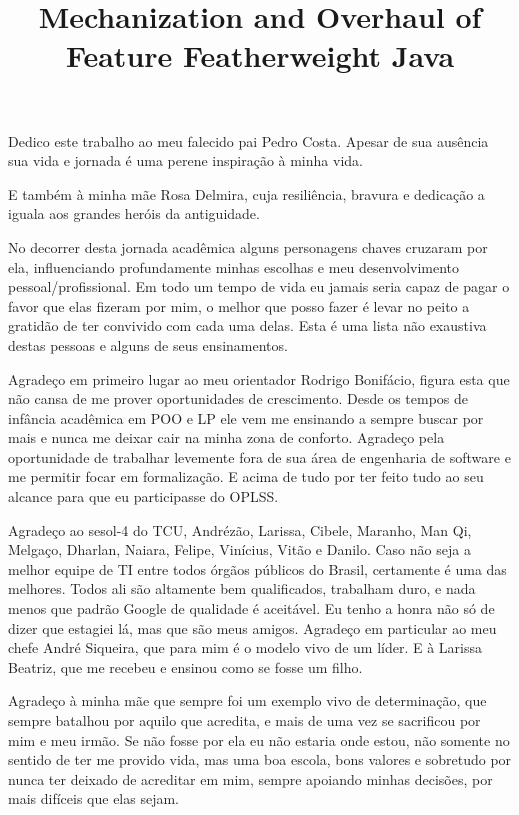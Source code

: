 \documentclass[bacharelado]{unb-cic}
\title{Mechanization and Overhaul of Feature Featherweight Java}
\theoremstyle{definition}
\theoremstyle{definition}
\begin{document}
  \maketitle
  \pretextual

  \begin{dedicatoria}
      Dedico este trabalho ao meu falecido pai Pedro Costa.
      Apesar de sua ausência sua vida e jornada é uma perene inspiração
      à minha vida.

      E também à minha mãe Rosa Delmira, cuja resiliência,
      bravura e dedicação a iguala aos grandes heróis da antiguidade.
  \end{dedicatoria}

  \begin{agradecimentos}
    No decorrer desta jornada acadêmica alguns personagens chaves cruzaram por ela,
    influenciando profundamente minhas escolhas e meu desenvolvimento pessoal/profissional. Em todo um tempo de vida eu jamais seria capaz de pagar o favor
    que elas fizeram por mim, o melhor que posso fazer é levar no peito a gratidão
    de ter convivido com cada uma delas. Esta é uma lista não exaustiva destas pessoas e alguns de seus ensinamentos.

    Agradeço em primeiro lugar ao meu orientador Rodrigo Bonifácio, figura esta que 
    não cansa de me prover oportunidades de crescimento. Desde os tempos de infância
    acadêmica em POO e LP ele vem me ensinando a sempre buscar por mais e nunca 
    me deixar cair na minha zona de conforto. Agradeço pela oportunidade de trabalhar
    levemente fora de sua área de engenharia de software e me permitir focar em formalização. E acima de tudo por ter feito tudo ao seu alcance para que eu participasse do OPLSS.

    Agradeço ao sesol-4 do TCU, Andrézão, Larissa, Cibele, Maranho, Man Qi, Melgaço,
    Dharlan, Naiara, Felipe, Vinícius, Vitão e Danilo.
    Caso não seja a melhor equipe de TI entre todos órgãos públicos do Brasil,
    certamente é uma das melhores. Todos ali são altamente bem qualificados,
    trabalham duro, e nada menos que padrão Google de qualidade é aceitável.
    Eu tenho a honra não só de dizer que estagiei lá, mas que são meus amigos.
    Agradeço em particular ao meu chefe André Siqueira, que para mim é o modelo vivo de um líder.
    E à Larissa Beatriz, que me recebeu e ensinou como se fosse um filho.

    Agradeço à minha mãe que sempre foi um exemplo vivo de determinação,
    que sempre batalhou por aquilo que acredita, e mais de uma vez se sacrificou
    por mim e meu irmão. Se não fosse por ela eu não estaria onde estou, não somente
    no sentido de ter me provido vida, mas uma boa escola, bons valores e sobretudo
    por nunca ter deixado de acreditar em mim, sempre apoiando minhas decisões, por
    mais difíceis que elas sejam.


\end{agradecimentos}
\end{document}
